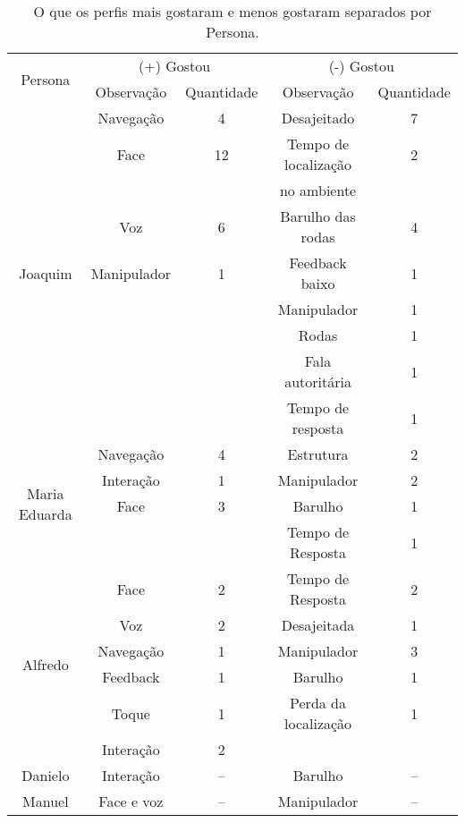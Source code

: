 \begin{table}[!ht]
	\caption{O que os perfis mais gostaram e menos gostaram separados por Persona.}
	\label{tab:agradou}
	\centering
	\begin{tabular}{c | c | c | c | c}
        \hline
        \multirow{2}{*}{Persona} & \multicolumn{2}{c}{(+) Gostou} & \multicolumn{2}{c}{(-) Gostou} \\
        \hhline{~----}
		& Observação & Quantidade & Observação & Quantidade \\
		\hline
        \multirow{9}{*}{Joaquim} & Navegação & 4 & Desajeitado & 7 \\
        \hhline{~----}
		& Face & 12 & Tempo de localização & 2 \\
        & & & no ambiente &  \\
        \hhline{~----}
        & Voz & 6 & Barulho das rodas & 4 \\
        \hhline{~----}
        & Manipulador & 1 & Feedback baixo & 1 \\
        \hhline{~----}
        & & & Manipulador & 1 \\
        \hhline{~----}
		& & & Rodas & 1 \\
        \hhline{~----}
		& & & Fala autoritária & 1 \\
        \hhline{~----}
		& & & Tempo de resposta & 1 \\
        \hline
        \multirow{4}{*}{Maria Eduarda} & Navegação & 4 & Estrutura & 2 \\
        \hhline{~----}
        & Interação & 1 & Manipulador & 2 \\
        \hhline{~----}
        & Face & 3 & Barulho & 1 \\
		\hhline{~----}
        & & & Tempo de Resposta & 1 \\
        \hline
        \multirow{6}{*}{Alfredo} & Face & 2 & Tempo de Resposta & 2 \\
        \hhline{~----}
        & Voz & 2 & Desajeitada & 1 \\
        \hhline{~----}
        & Navegação & 1 & Manipulador & 3 \\
		\hhline{~----}
        & Feedback & 1 & Barulho & 1 \\
		\hhline{~----}
        & Toque & 1 & Perda da localização & 1 \\
		\hhline{~----}
        & Interação & 2 & & \\
        \hline
        Danielo & Interação & -- & Barulho & -- \\
        \hline
        Manuel & Face e voz & -- & Manipulador & -- \\
        \hline
    \end{tabular}
\end{table}

